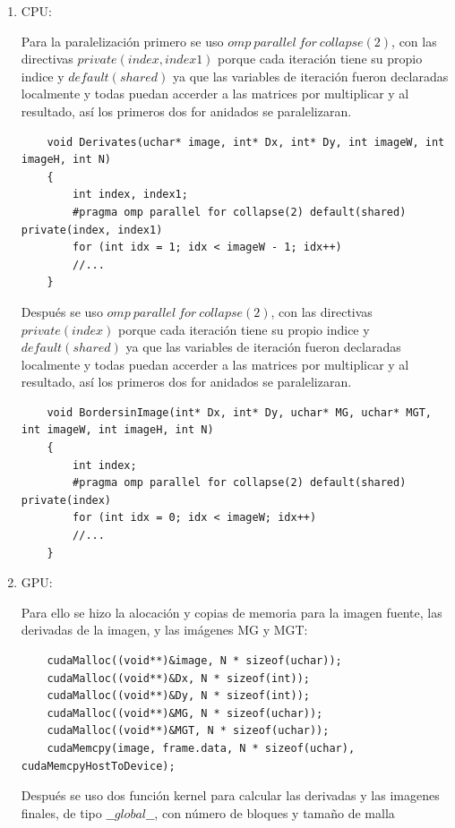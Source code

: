 \documentclass[letterpaper]{article}
\theoremstyle{definition}
\theoremstyle{lemathm}
\theoremstyle{lemathm}
\theoremstyle{lemathm}
\theoremstyle{lemademthm}
\newcommand{\1}{\mathbbm{1}}
\begin{document}
	\begin{enumerate}
		\item CPU:

		Para la paralelización primero se uso $omp\ parallel\ for\ collapse(2)$, con las directivas $private(index, index1)$ porque cada iteración tiene su propio indice y $default(shared)$ ya que las variables de iteración fueron declaradas localmente y todas puedan accerder a las matrices por multiplicar y al resultado, así los primeros dos for anidados se paralelizaran.

		\begin{verbatim}
	void Derivates(uchar* image, int* Dx, int* Dy, int imageW, int imageH, int N)
	{
		int index, index1;
		#pragma omp parallel for collapse(2) default(shared) private(index, index1)
		for (int idx = 1; idx < imageW - 1; idx++)
		//...
	}
		\end{verbatim}

		Después se uso $omp\ parallel\ for\ collapse(2)$, con las directivas $private(index)$ porque cada iteración tiene su propio indice y $default(shared)$ ya que las variables de iteración fueron declaradas localmente y todas puedan accerder a las matrices por multiplicar y al resultado, así los primeros dos for anidados se paralelizaran.

		\begin{verbatim}
	void BordersinImage(int* Dx, int* Dy, uchar* MG, uchar* MGT, int imageW, int imageH, int N)
	{
		int index;
		#pragma omp parallel for collapse(2) default(shared) private(index)
		for (int idx = 0; idx < imageW; idx++)
		//...
	}
		\end{verbatim}

		\item GPU:
		
		Para ello se hizo la alocación y copias de memoria para la imagen fuente, las derivadas de la imagen, y las imágenes MG y MGT:

		\begin{verbatim}
	cudaMalloc((void**)&image, N * sizeof(uchar));
	cudaMalloc((void**)&Dx, N * sizeof(int));
	cudaMalloc((void**)&Dy, N * sizeof(int));
	cudaMalloc((void**)&MG, N * sizeof(uchar));
	cudaMalloc((void**)&MGT, N * sizeof(uchar));
	cudaMemcpy(image, frame.data, N * sizeof(uchar), cudaMemcpyHostToDevice);
		\end{verbatim}

		Después se uso dos función kernel para calcular las derivadas y las imagenes finales, de tipo $\_\_global\_\_$, con número de bloques y tamaño de malla


\end{enumerate}
\end{document}
